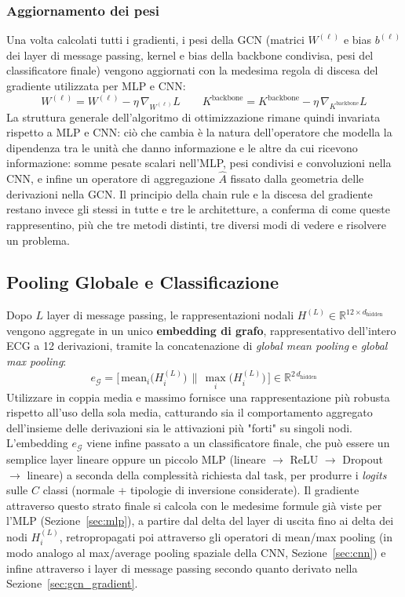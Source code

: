 \subsubsection{Aggiornamento dei pesi}

Una volta calcolati tutti i gradienti, i pesi della GCN (matrici $W^{(\ell)}$ e bias $b^{(\ell)}$ dei layer di message passing, kernel e bias della backbone condivisa, pesi del classificatore finale) vengono aggiornati con la medesima regola di discesa del gradiente utilizzata per MLP e CNN:
\[
W^{(\ell)}=W^{(\ell)}-\eta\,\nabla_{W^{(\ell)}}L \qquad K^{\text{backbone}}=K^{\text{backbone}}-\eta\,\nabla_{K^{\text{backbone}}}L
\]
La struttura generale dell'algoritmo di ottimizzazione rimane quindi invariata rispetto a MLP e CNN: ciò che cambia è la natura dell'operatore che modella la dipendenza tra le unità che danno informazione e le altre da cui ricevono informazione: somme pesate scalari nell'MLP, pesi condivisi e convoluzioni nella CNN, e infine un operatore di aggregazione $\hat A$ fissato dalla geometria delle derivazioni nella GCN. Il principio della chain rule e la discesa del gradiente restano invece gli stessi in tutte e tre le architetture, a conferma di come queste rappresentino, più che tre metodi distinti, tre diversi modi di vedere e risolvere un problema.

\subsection{Pooling Globale e Classificazione}
\label{sec:global_pooling}

Dopo $L$ layer di message passing, le rappresentazioni nodali $H^{(L)}\in\mathbb{R}^{12\times d_{\text{hidden}}}$ vengono aggregate in un unico \textbf{embedding di grafo}, rappresentativo dell'intero ECG a 12 derivazioni, tramite la concatenazione di \textit{global mean pooling} e \textit{global max pooling}:
\begin{equation}
	e_{\mathcal{G}} = \big[\,\text{mean}_i\big(H^{(L)}_i\big) \,\|\, \max_i\big(H^{(L)}_i\big)\,\big] \in \mathbb{R}^{2\,d_{\text{hidden}}}
\end{equation}
Utilizzare in coppia media e massimo fornisce una rappresentazione più robusta rispetto all'uso della sola media, catturando sia il comportamento aggregato dell'insieme delle derivazioni sia le attivazioni più "forti" su singoli nodi. L'embedding $e_{\mathcal{G}}$ viene infine passato a un classificatore finale, che può essere un semplice layer lineare oppure un piccolo MLP (lineare $\to$ ReLU $\to$ Dropout \cite{srivastava2014dropout} $\to$ lineare) a seconda della complessità richiesta dal task, per produrre i \textit{logits} sulle $C$ classi (normale + tipologie di inversione considerate). Il gradiente attraverso questo strato finale si calcola con le medesime formule già viste per l'MLP (Sezione~\ref{sec:mlp}), a partire dal delta del layer di uscita fino ai delta dei nodi $H^{(L)}_i$, retropropagati poi attraverso gli operatori di mean/max pooling (in modo analogo al max/average pooling spaziale della CNN, Sezione~\ref{sec:cnn}) e infine attraverso i layer di message passing secondo quanto derivato nella Sezione~\ref{sec:gcn_gradient}.
